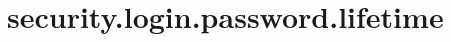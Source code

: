 \section{security.login.password.lifetime}
\label{configuration:SecurityLoginPasswordLifetime}
\TODO

